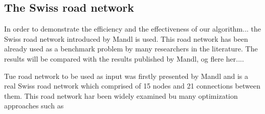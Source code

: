 \subsection{The Swiss road network}
In order to demonstrate the efficiency and the effectiveness of our algorithm... the Swiss road network introduced by Mandl is used. This road network has been already used as a benchmark problem by many researchers in the literature. \citep{kechagiopoulos14}
The results will be compared with the results published by Mandl, og flere her....

Tue road network to be used as input was firstly presented by Mandl and is a real Swiss road network which comprised of 15 nodes and 21 connections between them. This road network har been widely examined bu many optimization approaches such as \citep{kechagiopoulos14}




